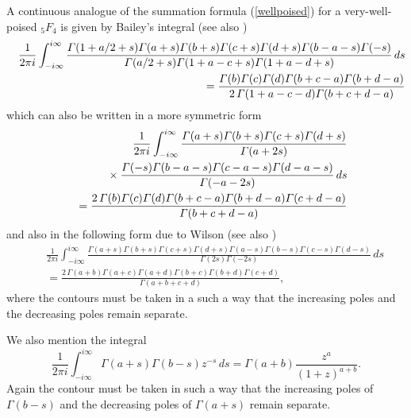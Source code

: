 \documentclass[envcountchap,graybox]{svmono}
\newcommand{\mathindent}{\hspace{7.5mm}}
\renewcommand{\Gamma}{\varGamma}
\begin{document}
A continuous analogue of the summation formula (\ref{wellpoised}) for a very-well-poised
${}_5F_4$ is given by Bailey's integral (see also \cite{Bailey35})
\begin{eqnarray}
\label{Bailey1}\index{Bailey's integral}
& &\frac{1}{2\pi i}\int_{-i\infty}^{i\infty}
\frac{\Gamma(1+a/2+s)\Gamma(a+s)\Gamma(b+s)\Gamma(c+s)\Gamma(d+s)\Gamma(b-a-s)\Gamma(-s)}
{\Gamma(a/2+s)\Gamma(1+a-c+s)\Gamma(1+a-d+s)}\,ds\nonumber\\
& &{}=\frac{\Gamma(b)\Gamma(c)\Gamma(d)\Gamma(b+c-a)\Gamma(b+d-a)}
{2\,\Gamma(1+a-c-d)\Gamma(b+c+d-a)}
\end{eqnarray}
which can also be written in a more symmetric form
\begin{eqnarray}
\label{Bailey2}
& &\frac{1}{2\pi i}\int_{-i\infty}^{i\infty}
\frac{\Gamma(a+s)\Gamma(b+s)\Gamma(c+s)\Gamma(d+s)}{\Gamma(a+2s)}\nonumber\\
& &{}\mathindent\times\frac{\Gamma(-s)\Gamma(b-a-s)\Gamma(c-a-s)\Gamma(d-a-s)}{\Gamma(-a-2s)}\,ds\nonumber\\
& &{}=\frac{2\,\Gamma(b)\Gamma(c)\Gamma(d)\Gamma(b+c-a)\Gamma(b+d-a)\Gamma(c+d-a)}{\Gamma(b+c+d-a)}
\end{eqnarray}
and also in the following form due to Wilson (see also \cite{Wilson80})
\begin{eqnarray}
\label{Bailey3}
& &\frac{1}{2\pi i}\int_{-i\infty}^{i\infty}
\frac{\Gamma(a+s)\Gamma(b+s)\Gamma(c+s)\Gamma(d+s)\Gamma(a-s)\Gamma(b-s)\Gamma(c-s)\Gamma(d-s)}
{\Gamma(2s)\Gamma(-2s)}\,ds\nonumber\\
& &{}=\frac{2\,\Gamma(a+b)\Gamma(a+c)\Gamma(a+d)\Gamma(b+c)\Gamma(b+d)\Gamma(c+d)}{\Gamma(a+b+c+d)},
\end{eqnarray}
where the contours must be taken in a such a way that the increasing poles and the
decreasing poles remain separate.

We also mention the integral
\begin{equation}
\label{Slater}
\frac{1}{2\pi i}\int_{-i\infty}^{i\infty}\Gamma(a+s)\Gamma(b-s)z^{-s}\,ds
=\Gamma(a+b)\frac{z^a}{(1+z)^{a+b}}.
\end{equation}
Again the contour must be taken in such a way that the increasing poles of $\Gamma(b-s)$ and
the decreasing poles of $\Gamma(a+s)$ remain separate.
\end{document}
